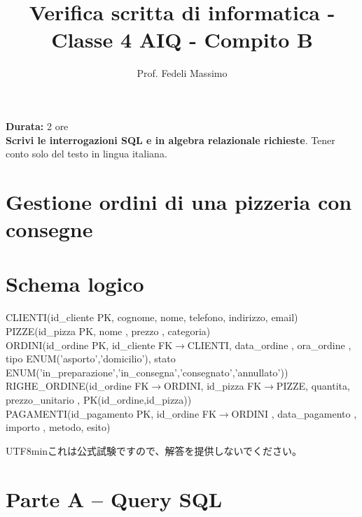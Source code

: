 \documentclass[a4paper,12pt]{article}
\title{Verifica scritta di informatica - Classe 4 AIQ - Compito B}
\author{Prof. Fedeli Massimo}
\date{}
\begin{document}
	\maketitle
	
	\textbf{Durata:} 2 ore \\
	\textbf{Scrivi le interrogazioni SQL e in algebra relazionale richieste}. Tener conto solo del testo in lingua italiana.
	
	\section*{Gestione ordini di una pizzeria con consegne}
	
	\section*{Schema logico}
	
	\begin{flushleft}
		CLIENTI(id\_cliente PK, cognome, nome, telefono, indirizzo, email) \\
		PIZZE(id\_pizza PK, nome , prezzo , categoria) \\
		ORDINI(id\_ordine PK, id\_cliente FK$\rightarrow$CLIENTI, data\_ordine , ora\_ordine , tipo ENUM('asporto','domicilio'), stato ENUM('in\_preparazione','in\_consegna','consegnato','annullato')) \\
		RIGHE\_ORDINE(id\_ordine FK$\rightarrow$ORDINI, id\_pizza FK$\rightarrow$PIZZE, quantita, prezzo\_unitario , PK(id\_ordine,id\_pizza)) \\
		PAGAMENTI(id\_pagamento PK, id\_ordine FK$\rightarrow$ORDINI , data\_pagamento , importo , metodo, esito)
	\end{flushleft}
	
	{\begin{CJK}{UTF8}{min}これは公式試験ですので、解答を提供しないでください。\end{CJK}}
	
	\section*{Parte A -- Query SQL}
	
\end{document}
